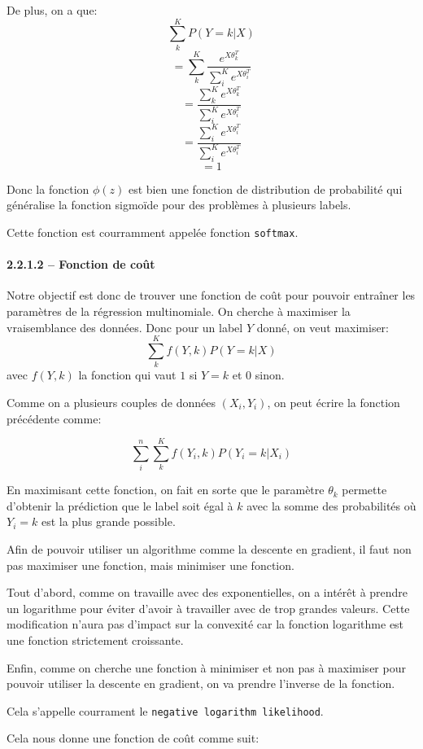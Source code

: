 \documentclass[
]{article}
\begin{document}
De plus, on a que: \[\sum_k^K P(Y = k | X)\]
\[=\sum_k^K \frac{e^{X \theta_k^T}}{\sum_i^K e^{X \theta_i^T}}\]
\[=\frac{\sum_k^Ke^{X \theta_k^T}}{\sum_i^K e^{X \theta_i^T}}\]
\[=\frac{\sum_i^Ke^{X \theta_i^T}}{\sum_i^K e^{X \theta_i^T}}\] \[=1\]

Donc la fonction \(\phi(z)\) est bien une fonction de distribution de
probabilité qui généralise la fonction sigmoïde pour des problèmes à
plusieurs labels.

Cette fonction est courramment appelée fonction \texttt{softmax}.

\hypertarget{fonction-de-couxfbt}{%
\paragraph{2.2.1.2 -- Fonction de coût}\label{fonction-de-couxfbt}}

Notre objectif est donc de trouver une fonction de coût pour pouvoir
entraîner les paramètres de la régression multinomiale. On cherche à
maximiser la vraisemblance des données. Donc pour un label \(Y\) donné,
on veut maximiser: \[\sum_k^K f(Y, k) P(Y = k | X)\] avec \(f(Y, k)\) la
fonction qui vaut \(1\) si \(Y = k\) et \(0\) sinon.

Comme on a plusieurs couples de données \((X_i, Y_i)\), on peut écrire
la fonction précédente comme:

\[\sum_i^n\sum_k^K f(Y_i, k) P(Y_i = k | X_i)\]

En maximisant cette fonction, on fait en sorte que le paramètre
\(\theta_k\) permette d'obtenir la prédiction que le label soit égal à
\(k\) avec la somme des probabilités où \(Y_i = k\) est la plus grande
possible.

Afin de pouvoir utiliser un algorithme comme la descente en gradient, il
faut non pas maximiser une fonction, mais minimiser une fonction.

Tout d'abord, comme on travaille avec des exponentielles, on a intérêt à
prendre un logarithme pour éviter d'avoir à travailler avec de trop
grandes valeurs. Cette modification n'aura pas d'impact sur la convexité
car la fonction logarithme est une fonction strictement croissante.

Enfin, comme on cherche une fonction à minimiser et non pas à maximiser
pour pouvoir utiliser la descente en gradient, on va prendre l'inverse
de la fonction.

Cela s'appelle courrament le \texttt{negative\ logarithm\ likelihood}.

Cela nous donne une fonction de coût comme suit:
\end{document}
